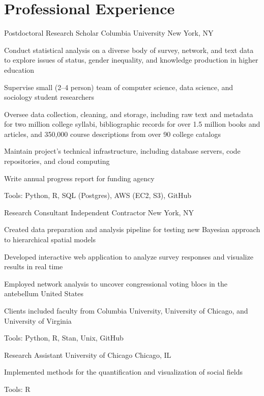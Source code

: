 
\section*{Professional Experience}

  {Postdoctoral Research Scholar}
  {Columbia University}
  {New York, NY}
  {
    \item Conduct statistical analysis on a diverse body of survey, network, and text data to explore issues of status, gender inequality, and knowledge production in higher education
    \item Supervise small (2–4 person) team of computer science, data science, and sociology student researchers
    \item Oversee data collection, cleaning, and storage, including raw text and metadata for two million college syllabi, bibliographic records for over 1.5 million books and articles, and 350,000 course descriptions from over 90 college catalogs
    \item Maintain project's technical infrastructure, including database servers, code repositories, and cloud computing
    \item Write annual progress report for funding agency
    \item Tools: Python, R, SQL (Postgres), AWS (EC2, S3), GitHub
  }

  {Research Consultant}
  {Independent Contractor}
  {New York, NY}
  {
    \item Created data preparation and analysis pipeline for testing new Bayesian approach to hierarchical spatial models
    \item Developed interactive web application to analyze survey responses and visualize results in real time
    \item Employed network analysis to uncover congressional voting blocs in the antebellum United States
    \item Clients included faculty from Columbia University, University of Chicago, and University of Virginia
    \item Tools: Python, R, Stan, Unix, GitHub
  }

  {Research Assistant}
  {University of Chicago}
  {Chicago, IL}
  {
    \item Implemented methods for the quantification and visualization of social fields
    \item Tools: R
  }

